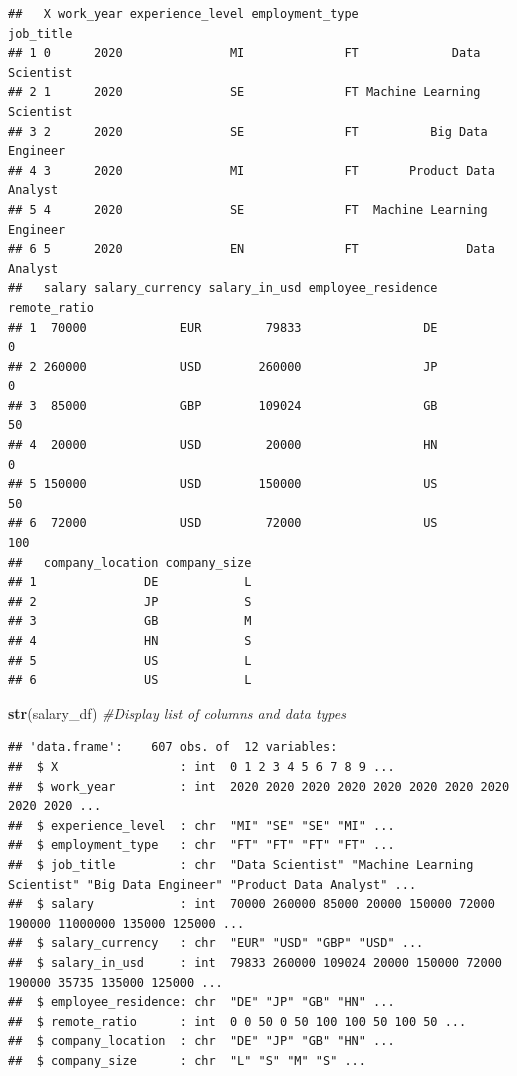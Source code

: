 \documentclass[
]{article}
\newenvironment{Shaded}{\begin{snugshade}}{\end{snugshade}}
\newcommand{\CommentTok}[1]{\textcolor[rgb]{0.56,0.35,0.01}{\textit{#1}}}
\newcommand{\FunctionTok}[1]{\textcolor[rgb]{0.13,0.29,0.53}{\textbf{#1}}}
\newcommand{\NormalTok}[1]{#1}
\begin{document}
\begin{verbatim}
##   X work_year experience_level employment_type                  job_title
## 1 0      2020               MI              FT             Data Scientist
## 2 1      2020               SE              FT Machine Learning Scientist
## 3 2      2020               SE              FT          Big Data Engineer
## 4 3      2020               MI              FT       Product Data Analyst
## 5 4      2020               SE              FT  Machine Learning Engineer
## 6 5      2020               EN              FT               Data Analyst
##   salary salary_currency salary_in_usd employee_residence remote_ratio
## 1  70000             EUR         79833                 DE            0
## 2 260000             USD        260000                 JP            0
## 3  85000             GBP        109024                 GB           50
## 4  20000             USD         20000                 HN            0
## 5 150000             USD        150000                 US           50
## 6  72000             USD         72000                 US          100
##   company_location company_size
## 1               DE            L
## 2               JP            S
## 3               GB            M
## 4               HN            S
## 5               US            L
## 6               US            L
\end{verbatim}

\begin{Shaded}
\begin{Highlighting}[]
\FunctionTok{str}\NormalTok{(salary\_df)  }\CommentTok{\#Display list of columns and data types}
\end{Highlighting}
\end{Shaded}

\begin{verbatim}
## 'data.frame':    607 obs. of  12 variables:
##  $ X                 : int  0 1 2 3 4 5 6 7 8 9 ...
##  $ work_year         : int  2020 2020 2020 2020 2020 2020 2020 2020 2020 2020 ...
##  $ experience_level  : chr  "MI" "SE" "SE" "MI" ...
##  $ employment_type   : chr  "FT" "FT" "FT" "FT" ...
##  $ job_title         : chr  "Data Scientist" "Machine Learning Scientist" "Big Data Engineer" "Product Data Analyst" ...
##  $ salary            : int  70000 260000 85000 20000 150000 72000 190000 11000000 135000 125000 ...
##  $ salary_currency   : chr  "EUR" "USD" "GBP" "USD" ...
##  $ salary_in_usd     : int  79833 260000 109024 20000 150000 72000 190000 35735 135000 125000 ...
##  $ employee_residence: chr  "DE" "JP" "GB" "HN" ...
##  $ remote_ratio      : int  0 0 50 0 50 100 100 50 100 50 ...
##  $ company_location  : chr  "DE" "JP" "GB" "HN" ...
##  $ company_size      : chr  "L" "S" "M" "S" ...
\end{verbatim}
\end{document}
